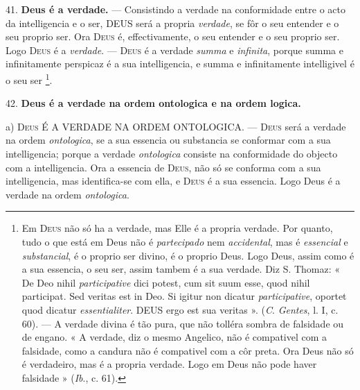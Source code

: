  41. \textbf{Deus é a verdade.} --- Consistindo a verdade na conformidade entre o acto da intelligencia e o ser, \textsc{DEUS} será a propria \emph{verdade}, se fôr o seu entender e o seu proprio ser. Ora \textsc{Deus} é, effectivamente, o seu entender e o seu proprio ser. Logo \textsc{Deus} é a \emph{verdade}. --- \textsc{Deus} é a verdade \emph{summa} e \emph{infinita}, porque summa e infinitamente perspicaz é a sua intelligencia, e summa e infinitamente intelligivel é o seu ser \footnote{Em \textsc{Deus} não só ha a verdade, mas Elle é a propria verdade. Por quanto, tudo o que está em Deus não é \emph{partecipado} nem \emph{accidental}, mas é \emph{essencial} e \emph{substancial}, é o proprio ser divino, é o proprio Deus. Logo Deus, assim como é a sua essencia, o seu ser, assim tambem é a sua verdade. Diz S. Thomaz: « De Deo nihil \emph{participative} dici potest, cum sit suum esse, quod nihil participat. Sed veritas est in Deo. Si igitur non dicatur \emph{participative}, oportet quod dicatur \emph{essentialiter}. \textsc{DEUS} ergo est sua veritas ». (\emph{C}. \emph{Gentes}, l. I, c. 60). --- A verdade divina é tão pura, que não tolléra sombra de falsidade ou de engano. « A verdade, diz o mesmo Angelico, não é compativel com a falsidade, como a candura não é compativel com a côr preta. Ora Deus não só é verdadeiro, mas é a propria verdade. Logo em Deus não pode haver falsidade » (\emph{Ib}., c. 61).}.

42. \textbf{Deus é a verdade na ordem ontologica e na ordem logica.}

a) \textsc{Deus} É A VERDADE NA ORDEM ONTOLOGICA. --- \textsc{Deus} será a verdade na ordem \emph{ontologica}, se a sua essencia ou substancia se conformar com a sua intelligencia; porque a verdade \emph{ontologica} consiste na conformidade do objecto com a intelligencia. Ora a essencia de \textsc{Deus}, não só se conforma com a sua intelligencia, mas identifica-se com ella, e \textsc{Deus} é a sua essencia. Logo Deus é a verdade na ordem \emph{ontologica}.

